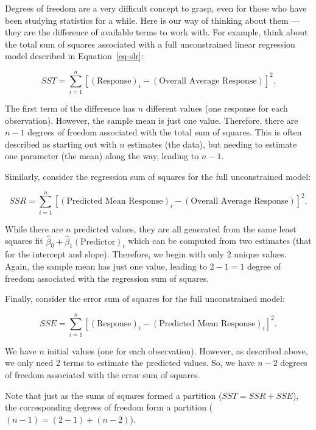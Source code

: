 \documentclass[
  letterpaper,
  DIV=11,
  numbers=noendperiod]{scrreprt}
\theoremstyle{definition}
\theoremstyle{definition}
\theoremstyle{plain}
\theoremstyle{remark}
\begin{document}
\begin{tcolorbox}[enhanced jigsaw, rightrule=.15mm, colback=white, colbacktitle=quarto-callout-note-color!10!white, title=\textcolor{quarto-callout-note-color}{\faInfo}\hspace{0.5em}{Rationale for Degrees of Freedom}, arc=.35mm, toptitle=1mm, toprule=.15mm, breakable, titlerule=0mm, opacityback=0, colframe=quarto-callout-note-color-frame, opacitybacktitle=0.6, bottomrule=.15mm, bottomtitle=1mm, coltitle=black, left=2mm, leftrule=.75mm]

Degrees of freedom are a very difficult concept to grasp, even for those
who have been studying statistics for a while. Here is our way of
thinking about them --- they are the difference of available terms to
work with. For example, think about the total sum of squares associated
with a full unconstrained linear regression model described in
Equation~\ref{eq-slr}:

\[SST = \sum_{i=1}^{n} \left[(\text{Response})_i - (\text{Overall Average Response})\right]^2.\]

The first term of the difference has \(n\) different values (one
response for each observation). However, the sample mean is just one
value. Therefore, there are \(n - 1\) degrees of freedom associated with
the total sum of squares. This is often described as starting out with
\(n\) estimates (the data), but needing to estimate one parameter (the
mean) along the way, leading to \(n - 1\).

Similarly, consider the regression sum of squares for the full
unconstrained model:

\[SSR = \sum_{i=1}^{n} \left[(\text{Predicted Mean Response})_i - (\text{Overall Average Response})\right]^2.\]

While there are \(n\) predicted values, they are all generated from the
same least squares fit
\(\widehat{\beta}_0 + \widehat{\beta}_1 (\text{Predictor})_i\) which can
be computed from two estimates (that for the intercept and slope).
Therefore, we begin with only 2 unique values. Again, the sample mean
has just one value, leading to \(2 - 1 = 1\) degree of freedom
associated with the regression sum of squares.

Finally, consider the error sum of squares for the full unconstrained
model:

\[SSE = \sum_{i=1}^{n} \left[(\text{Response})_i - (\text{Predicted Mean Response})_i\right]^2.\]

We have \(n\) initial values (one for each observation). However, as
described above, we only need 2 terms to estimate the predicted values.
So, we have \(n - 2\) degrees of freedom associated with the error sum
of squares.

Note that just as the sums of squares formed a partition
(\(SST = SSR + SSE\)), the corresponding degrees of freedom form a
partition (\((n - 1) = (2 - 1) + (n - 2)\)).

\end{tcolorbox}
\end{document}
